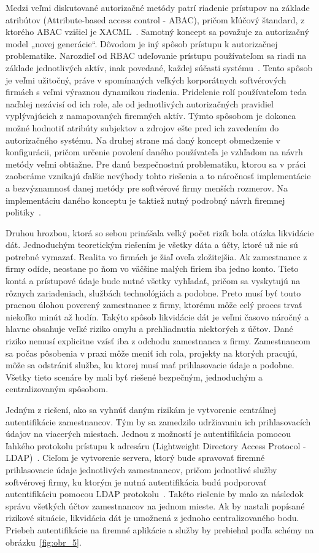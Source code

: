 Medzi veľmi diskutované autorizačné metódy patrí riadenie prístupov na základe atribútov (Attribute-based access
control - ABAC), pričom kľúčový štandard, z ktorého ABAC vzišiel je XACML~\cite{XACML}.
Samotný koncept sa považuje za autorizačný model „novej generácie“.
Dôvodom je iný spôsob prístupu k autorizačnej problematike.
Narozdieľ od RBAC udeľovanie prístupu používateľom sa riadi na základe jednotlivých aktív, inak povedané, každej súčasti
systému~\cite{ABAC_RBAC_Attributes}.
Tento spôsob je veľmi užitočný, práve v spomínaných veľkých korporátnych softvérových firmách s veľmi výraznou dynamikou riadenia.
Pridelenie rolí používateľom teda naďalej nezávisí od ich role, ale od jednotlivých autorizačných pravidiel vyplývajúcich z namapovaných firemných aktív.
Týmto spôsobom je dokonca možné hodnotiť atribúty subjektov a zdrojov ešte pred ich zavedením do autorizačného systému.
Na druhej strane má daný koncept obmedzenie v konfigurácii, pričom určenie povolení daného používateľa je vzhľadom na návrh metódy veľmi obtiažne.
Pre danú bezpečnostnú problematiku, ktorou sa v práci zaoberáme vznikajú ďalšie nevýhody tohto riešenia a to náročnosť
implementácie a bezvýznamnosť danej metódy pre softvérové firmy menších rozmerov.
Na implementáciu daného konceptu je taktiež nutný podrobný návrh firemnej politiky~\cite{RBAC_ABAC_Encryption}.

Druhou hrozbou, ktorá so sebou prinášala veľký počet rizík bola otázka likvidácie dát.
Jednoduchým teoretickým riešením je všetky dáta a účty, ktoré už nie sú potrebné vymazať.
Realita vo firmách je žiaľ oveľa zložitejšia.
Ak zamestnanec z firmy odíde, neostane po ňom vo väčšine malých firiem iba jedno konto.
Tieto kontá a prístupové údaje bude nutné všetky vyhľadať, pričom sa vyskytujú na rôznych zariadeniach, službách technológiách a podobne.
Preto musí byť touto pracnou úlohou poverený zamestnanec z firmy, ktorému môže celý proces trvať niekoľko minút až hodín.
Takýto spôsob likvidácie dát je veľmi časovo náročný a hlavne obsahuje veľké riziko omylu a prehliadnutia niektorých z účtov.
Dané riziko nemusí explicitne vzísť iba z odchodu zamestnanca z firmy.
Zamestnancom sa počas pôsobenia v praxi môže meniť ich rola, projekty na ktorých pracujú, môže sa odstrániť služba,
ku ktorej musí mať prihlasovacie údaje a podobne.
Všetky tieto scenáre by mali byť riešené bezpečným, jednoduchým a centralizovaným spôsobom.

Jedným z riešení, ako sa vyhnúť daným rizikám je vytvorenie centrálnej autentifikácie zamestnancov.
Tým by sa zamedzilo udržiavaniu ich prihlasovacích údajov na viacerých miestach.
Jednou z možností je autentifikácia pomocou ľahkého protokolu prístupu k adresáru (Lightweight Directory Access Protocol - LDAP)~\cite{LDAP}.
Cieľom je vytvorenie servera, ktorý bude spravovať firemné prihlasovacie údaje jednotlivých zamestnancov, pričom
jednotlivé služby softvérovej firmy, ku ktorým je nutná autentifikácia budú podporovať autentifikáciu pomocou LDAP protokolu~\cite{LDAP_AUTH}.
Takéto riešenie by malo za následok správu všetkých účtov zamestnancov na jednom mieste.
Ak by nastali popísané rizikové situácie, likvidácia dát je umožnená z jednoho centralizovaného bodu.
Priebeh autentifikácie na firemné aplikácie a služby by prebiehal podľa schémy na obrázku~\ref{fig:obr_5}.

